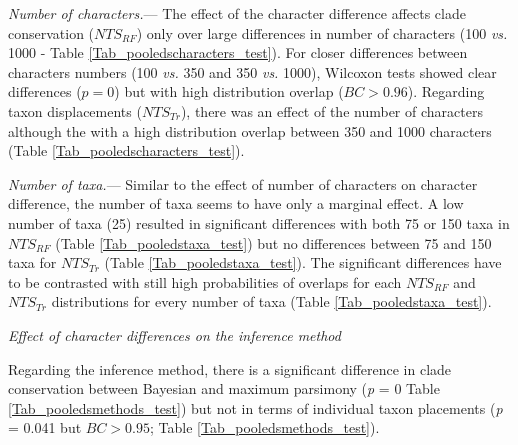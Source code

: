 \documentclass[12pt,letterpaper]{article}
\renewcommand{\subsection}[1]{%
\bigskip
\begin{center}
\begin{large}
\normalfont\itshape #1
\end{large}
\end{center}}
\renewcommand{\subsubsection}[1]{%
\vspace{2ex}
\noindent
\textit{#1.}---}
\begin{document}


\subsubsection{Number of characters}
The effect of the character difference affects clade conservation ($NTS_{RF}$) only over large differences in number of characters (100 \textit{vs.} 1000 - Table \ref{Tab_pooledscharacters_test}).
For closer differences between characters numbers (100 \textit{vs.} 350 and 350 \textit{vs.} 1000), Wilcoxon tests showed clear differences ($p = 0$) but with high distribution overlap ($BC > 0.96$).
Regarding taxon displacements ($NTS_{Tr}$), there was an effect of the number of characters although the with a high distribution overlap between 350 and 1000 characters (Table \ref{Tab_pooledscharacters_test}).



\subsubsection{Number of taxa}
Similar to the effect of number of characters on character difference, the number of taxa seems to have only a marginal effect.
A low number of taxa (25) resulted in significant differences with both 75 or 150 taxa in $NTS_{RF}$ (Table \ref{Tab_pooledstaxa_test}) but no differences between 75 and 150 taxa for $NTS_{Tr}$ (Table \ref{Tab_pooledstaxa_test}).
The significant differences have to be contrasted with still high probabilities of overlaps for each $NTS_{RF}$ and $NTS_{Tr}$ distributions for every number of taxa (Table \ref{Tab_pooledstaxa_test}).



\subsection{Effect of character differences on the inference method}
Regarding the inference method, there is a significant difference in clade conservation between Bayesian and maximum parsimony (\textit{p} = 0 Table \ref{Tab_pooledsmethods_test}) but not in terms of individual taxon placements (\textit{p} = 0.041 but $BC > 0.95$; Table \ref{Tab_pooledsmethods_test}).


\end{document}

